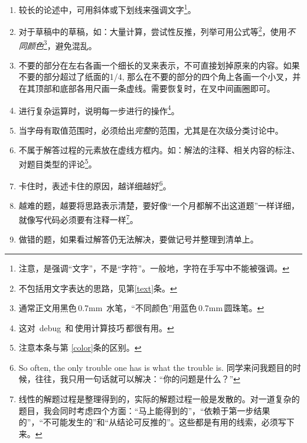 \documentclass[11pt, a4paper, titlepage]{article}
\begin{document}
\begin{enumerate}
\item 较长的论述中，可用斜体或下划线来强调文字\footnote{注意，是强调“文字”，不是“字符”。一般地，字符在手写中不能被强调。}。

\item \label{color}对于草稿中的草稿，如：大量计算，尝试性反推，列举可用公式等\footnote{不包括用文字表达的思路，见第\ref{text}条。}，使用{\fontsize{11.5pt}{1}\color{blue}\emph{不同颜色}}\footnote{通常正文用黑色\,0.7mm\, 水笔，“不同颜色”用蓝色\,0.7mm\,圆珠笔。}，避免混乱。

\item 不要的部分在左右各画一个细长的叉来表示，不可直接划掉原来的内容。如果不要的部分超过了纸面的1/4, 那么在不要的部分的四个角上各画一个小叉，并在其顶部和底部各用尺画一条虚线。需要恢复时，在叉中间画圈即可。

\item 进行复杂运算时，说明每一步进行的操作\footnote{这对\ debug\ 和\,使用计算技巧\,都很有用。}。

\item 当字母有取值范围时，必须给出\emph{完整}的范围，尤其是在次级分类讨论中。

\item 不属于解答过程的元素放在虚线方框内。如：解法的注释、相关内容的标注、对题目类型的评论\footnote{注意本条与第
    \ref{color}条的区别。}。

\item 卡住时，表述卡住的原因，越详细越好\footnote{So often, the only trouble one has is what the trouble is. 同学来问我题目的时候，往往，我只用一句话就可以解决：“你的问题是什么？”}。

\item \label{text}越难的题，越要将思路表示清楚，要好像“一个月都解不出这道题”一样详细，就像写代码必须要有注释一样\footnote{线性的解题过程是整理得到的，实际的解题过程一般是发散的。对一道复杂的题目，我会同时考虑四个方面：“马上能得到的”，“依赖于第一步结果的”，“不可能发生的”和“从结论可反推的”。这些都是有用的线索，必须写下来。}。

\item 做错的题，如果看过解答仍无法解决，要做记号并整理到清单上。
\end{enumerate}
\end{document}
